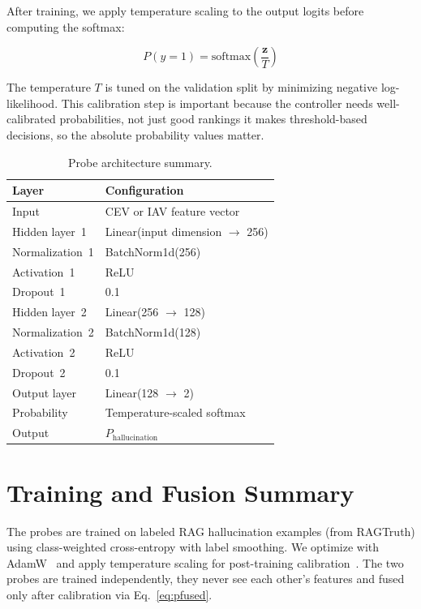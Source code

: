 After training, we apply temperature scaling to the output logits before computing the softmax:

\begin{equation}
    P(y = 1) = \text{softmax}\!\left(\frac{\mathbf{z}}{T}\right)
    \label{eq:temp_scaling}
\end{equation}

\noindent The temperature $T$ is tuned on the validation split by minimizing negative log-likelihood. This calibration step is important because the controller needs well-calibrated probabilities, not just good rankings it makes threshold-based decisions, so the absolute probability values matter.

\begin{table}[!htb]
\centering
\caption{Probe architecture summary.}
\label{tab:probe_architecture}
\begin{tabular}{@{}ll@{}}
\toprule
\textbf{Layer} & \textbf{Configuration} \\
\midrule
Input           & CEV or IAV feature vector \\
Hidden layer~1  & Linear(input dimension $\to$ 256) \\
Normalization~1 & BatchNorm1d(256) \\
Activation~1    & ReLU \\
Dropout~1       & 0.1 \\
Hidden layer~2  & Linear(256 $\to$ 128) \\
Normalization~2 & BatchNorm1d(128) \\
Activation~2    & ReLU \\
Dropout~2       & 0.1 \\
Output layer    & Linear(128 $\to$ 2) \\
Probability     & Temperature-scaled softmax \\
Output          & $P_{\text{hallucination}}$ \\
\bottomrule
\end{tabular}
\end{table}

\section{Training and Fusion Summary}
\label{sec:training_fusion_summary}

The probes are trained on labeled RAG hallucination examples (from RAGTruth) using class-weighted cross-entropy with label smoothing. We optimize with AdamW~\cite{loshchilov2019adamw,kingma2015adam} and apply temperature scaling for post-training calibration~\cite{guo2017calibration}. The two probes are trained independently, they never see each other's features and fused only after calibration via Eq.~\eqref{eq:pfused}.

